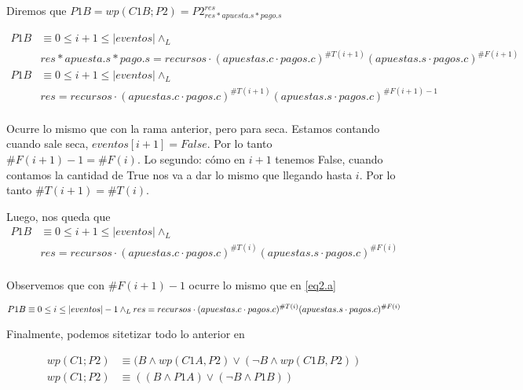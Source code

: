 \documentclass[../document.tex]{subfiles}
\begin{document}
Diremos que $P1B = wp(C1B;P2) = P2^{res}_{res * apuesta.s * pago.s}$

\begin{equation} \label{eq2.b}
\begin{split}
P1B & \equiv 0\leq i+1 \leq |eventos| \land_L \\& res * apuesta.s * pago.s = recursos \cdot (apuestas.c\cdot pagos.c)^{\#T(i+1)}(apuestas.s\cdot pagos.c)^{\#F(i+1)}\\
P1B & \equiv 0\leq i+1 \leq |eventos| \land_L \\& res = recursos \cdot (apuestas.c\cdot pagos.c)^{\#T(i+1)}(apuestas.s\cdot pagos.c)^{\#F(i+1)-1}\\
\end{split}
\end{equation}

Ocurre lo mismo que con la rama anterior, pero para seca.
Estamos contando cuando sale seca, $eventos[i+1] = False$. Por lo tanto $\#F(i+1)-1=\#F(i)$. Lo segundo: cómo en $i+1$ tenemos False, cuando contamos la cantidad de True nos va a dar lo mismo que llegando hasta $i$. Por lo tanto $\#T(i+1)=\#T(i)$.

Luego, nos queda que
\begin{equation}
    \begin{split}
    P1B & \equiv 0\leq i+1 \leq |eventos| \land_L \\& res = recursos \cdot (apuestas.c\cdot pagos.c)^{\#T(i)}(apuestas.s\cdot pagos.c)^{\#F(i)}\\
    \end{split}
\end{equation}

Observemos que con $\#F(i+1)-1$ ocurre lo mismo que en \ref{eq2.a}

\begin{equation} \label{P1A}
    P1B \equiv 0\leq i \leq |eventos|-1 \land_L \\ res = recursos \cdot (apuestas.c\cdot pagos.c)^{\#T(i)}(apuestas.s\cdot pagos.c)^{\#F(i)}\\
\end{equation}

Finalmente, podemos sitetizar todo lo anterior en

\begin{equation} \label{final}
\begin{split}
    wp(C1;P2) &\equiv (B \land wp(C1A, P2) \lor (\neg B \land wp(C1B, P2))\\
    wp(C1;P2) &\equiv ((B \land P1A) \lor (\neg B \land P1B))\\
\end{split}
\end{equation}
\end{document}
